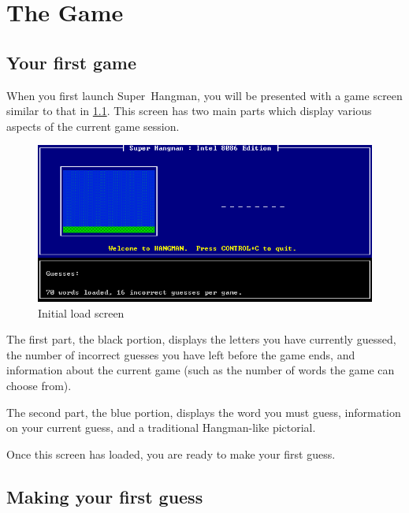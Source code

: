 
\lhead[\chaptername~\thechapter]{\rightmark}


\rhead[\leftmark]{}


\lfoot[\thepage]{}


\cfoot{}


\rfoot[]{\thepage}


\chapter{The Game}


\section{Your first game}

When you first launch \mbox{Super Hangman}, you will be presented
with a game screen similar to that in \ref{fig:Initial-load-screen}.
This screen has two main parts which display various aspects of the
current game session.

\begin{figure}[h]
\includegraphics[scale=0.5]{new_game}

\caption{\label{fig:Initial-load-screen}Initial load screen}
\end{figure}


The first part, the black portion, displays the letters you have currently
guessed, the number of incorrect guesses you have left before the
game ends, and information about the current game (such as the number
of words the game can choose from).

The second part, the blue portion, displays the word you must guess,
information on your current guess, and a traditional Hangman-like
pictorial.

Once this screen has loaded, you are ready to make your first guess.


\section{Making your first guess}

